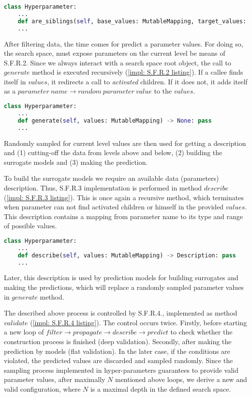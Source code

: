 \begin{lstlisting}[language=Python, caption=S.F.R.1 implementation., label=impl: S.F.R.1 listing]
class Hyperparameter:
	...
    def are_siblings(self, base_values: MutableMapping, target_values: MutableMapping) -> bool: pass
	...
\end{lstlisting}

After filtering data, the time comes for predict a parameter values. For doing so, the search space, must expose parameters on the current level be means of S.F.R.2. Since we always interact with a search space root object, the call to $generate$ method is executed recursively (\cref{impl: S.F.R.2 listing}). If a callee finds itself in $values$, it redirects a call to \textit{activated} children. If it does not, it adds itself as a $parameter\ name \rightarrow random\ parameter\ value$ to the $values$.

\begin{lstlisting}[language=Python, caption=S.F.R.2 implementation., label=impl: S.F.R.2 listing]
class Hyperparameter:
	...
    def generate(self, values: MutableMapping) -> None: pass
	...
\end{lstlisting}

Randomly sampled for current level values are then used for getting a description and (1) cutting-off the data from levels above and below, (2) building the surrogate models and (3) making the prediction.

To build the surrogate models we require an available data (parameters) description. Thus, S.F.R.3 implementation is performed in method $describe$ (\cref{impl: S.F.R.3 listing}). This is once again a recursive method, which terminates when parameter can not find activated children or himself in the provided $values$. 
This description contains a mapping from parameter name to its type and range of possible values.

\begin{lstlisting}[language=Python, caption=S.F.R.3 implementation., label=impl: S.F.R.3 listing]
class Hyperparameter:
	...
    def describe(self, values: MutableMapping) -> Description: pass
	...
\end{lstlisting}

Later, this description is used by prediction models for building surrogates and making the predictions, which will replace a randomly sampled parameter values in $generate$ method.

The described above process is controlled by S.F.R.4., implemented as method $validate$ (\cref{impl: S.F.R.4 listing}). The control occurs twice. Firstly, before starting a new loop of $filter \rightarrow propagate \rightarrow describe \rightarrow predict$ to check whether the construction process is finished (deep validation). Secondly, after making the prediction by models (flat validation). In the later case, if the conditions are violated, the predicted values are discarded and sampled randomly. Since the sampling process implemented in hyper-parameters guarantees to provide valid parameter values, after maximally $N$ mentioned above loops, we derive a new and valid configuration, where $N$ is a maximal depth in the defined search space.


